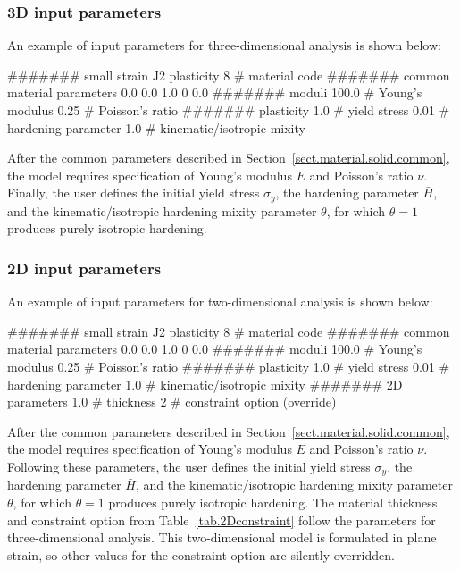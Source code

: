 \subsubsection{3D input parameters}
An example of input parameters for three-dimensional analysis is shown 
below:
\begin{inputfile}
####### small strain J2 plasticity
8     # material code
####### common material parameters
0.0    0.0    1.0
0      0.0
####### moduli
100.0 # Young's modulus
0.25  # Poisson's ratio
####### plasticity
1.0   # yield stress
0.01  # hardening parameter
1.0   # kinematic/isotropic mixity
\end{inputfile}
After the common parameters described in 
Section~\ref{sect.material.solid.common}, the 
model requires specification of Young's modulus 
$E$ and Poisson's ratio $\nu$. Finally, the user defines the initial 
yield stress $\sigma_{y}$, the hardening parameter $\bar{H}$, and the 
kinematic/isotropic hardening mixity parameter $\theta$, 
for which $\theta = 1$ produces purely isotropic hardening.

\subsubsection{2D input parameters}
An example of input parameters for two-dimensional analysis is shown 
below:
\begin{inputfile}
####### small strain J2 plasticity
8     # material code
####### common material parameters
0.0    0.0    1.0
0      0.0
####### moduli
100.0 # Young's modulus
0.25  # Poisson's ratio
####### plasticity
1.0   # yield stress
0.01  # hardening parameter
1.0   # kinematic/isotropic mixity
####### 2D parameters
1.0   # thickness
2     # constraint option (override)
\end{inputfile}
After the common parameters described in 
Section~\ref{sect.material.solid.common}, the 
model requires specification of Young's modulus 
$E$ and Poisson's ratio $\nu$. Following these parameters, 
the user defines the initial 
yield stress $\sigma_{y}$, the hardening parameter $\bar{H}$, and the 
kinematic/isotropic hardening mixity parameter $\theta$, 
for which $\theta = 1$ produces purely isotropic hardening.
The material thickness and 
constraint option from Table~\ref{tab.2Dconstraint} 
follow the parameters for three-dimensional analysis.
This two-dimensional model is formulated in plane strain,
so other values for the constraint option are silently
overridden.

